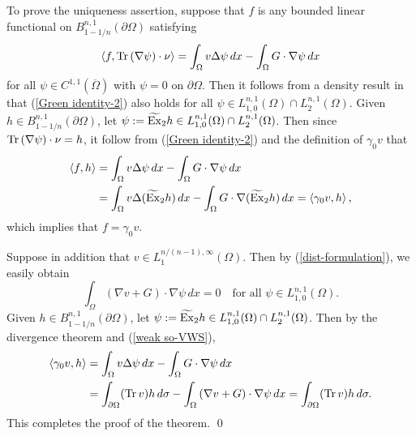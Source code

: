 \documentclass[reqno,centertags,11pt]{amsart}
\theoremstyle{definition}
\numberwithin{thm}{section}
\numberwithin{equation}{section}
\begin{document}
To prove the uniqueness assertion, suppose that $f$ is any bounded linear functional   on $B_{1-1/n}^{n,1}(\partial\Omega )$ satisfying \begin{equation}\label{Green identity-2}
\left\langle f, {\rm Tr}\, (\nabla \psi) \cdot \nu \right\rangle =\int_\Omega v \Delta \psi \, dx - \int_\Omega G \cdot \nabla \psi \, d x
\end{equation}
for all $\psi \in C^{1,1}(\overline{\Omega} )$ with $\psi =0$ on $\partial\Omega$. Then it follows from a density result in \cite[Lemma 2.10 (iv)]{KO} that (\ref{Green identity-2}) also  holds for all $\psi \in L_{1,0}^{n,1}(\Omega )\cap L_2^{n,1}(\Omega)$.
Given  $h \in B_{1-1/n}^{n,1}(\partial\Omega )$, let $\psi :=\widetilde{\rm  Ex}_2 h\in L_{1,0}^{n,1}(\Omega )\cap L_2^{n,1}(\Omega)$. Then since ${\rm Tr}\, (\nabla \psi) \cdot \nu=h$, it follow from  (\ref{Green identity-2}) and the definition of $\gamma_0 v$ that
\[\begin{split}
\left\langle f , h \right\rangle
&=\int_\Omega v \Delta \psi  \, dx - \int_\Omega G \cdot \nabla \psi  \, d x\\
&= \int_\Omega v \Delta (\widetilde{\rm  Ex}_2 h) \, dx - \int_\Omega G \cdot \nabla (\widetilde{\rm  Ex}_2 h) \, d x
 =\left\langle \gamma_0 v ,  h \right\rangle ,
\end{split}\]
which implies that $f =\gamma_0 v$.

Suppose in addition that $v \in L_1^{n/(n-1),\infty}(\Omega )$. Then by (\ref{dist-formulation}), we easily obtain
\begin{equation}\label{weak so-VWS}
\int_\Omega \left( \nabla v+ G \right)\cdot \nabla \psi \, d x =0 \quad\mbox{for all}\,\,\psi \in L_{1,0}^{n,1}(\Omega ).
\end{equation}
Given  $h \in B_{1-1/n}^{n,1}(\partial\Omega )$, let $\psi :=\widetilde{\rm  Ex}_2 h\in L_{1,0}^{n,1}(\Omega )\cap L_2^{n,1}(\Omega)$. Then by the divergence theorem and (\ref{weak so-VWS}),
\begin{align*}
\left\langle \gamma_0 v, h   \right\rangle &=\int_\Omega v \Delta \psi \, dx - \int_\Omega G \cdot \nabla \psi \, d x \\
&= \int_{\partial \Omega} ({\rm Tr}\, v) h \, d \sigma   - \int_\Omega \left( \nabla v+ G \right)\cdot \nabla \psi \, d x = \int_{\partial \Omega} ({\rm Tr}\, v) h \, d \sigma.
\end{align*}
This completes the proof of the theorem.
\qed



\bigskip
\noindent
\end{document}
